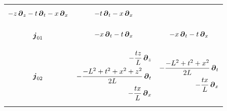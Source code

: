 \documentclass[a4paper,12pt]{article}
\begin{document}
\begin{table}[H]
\begin{adjustbox}{width=0.80\textwidth}
\begin{tabular}{ccc}
{\begin{equation*}
                        \begin{split}
                           -z \, \boldsymbol{\partial}_z -t \, \boldsymbol{\partial}_t -x \, \boldsymbol{\partial}_x
                        \end{split}
                     \end{equation*}} & \parbox{0.3\textwidth}{\begin{equation*}
                        \begin{split}
                           -t \, \boldsymbol{\partial}_t -x \, \boldsymbol{\partial}_x
                        \end{split}
                     \end{equation*}} \\
                     $\boldsymbol{j}_{0 1}$ & \parbox{0.3\textwidth}{\begin{equation*}
                        \begin{split}
                           -x \, \boldsymbol{\partial}_t -t \, \boldsymbol{\partial}_x
                        \end{split}
                     \end{equation*}} & \parbox{0.3\textwidth}{\begin{equation*}
                        \begin{split}
                           -x \, \boldsymbol{\partial}_t -t \, \boldsymbol{\partial}_x
                        \end{split}
                     \end{equation*}} \\
                     $\boldsymbol{j}_{0 2}$ & \parbox{0.3\textwidth}{\begin{equation*}
                        \begin{split}
                           -\frac{t z}{L} \, \boldsymbol{\partial}_z \\ - \frac{-L^2 + t^2 + x^2 + z^2}{2 L} \, \boldsymbol{\partial}_t \\ - \frac{t x}{L} \, \boldsymbol{\partial}_x
                        \end{split}
                     \end{equation*}} & \parbox{0.3\textwidth}{\begin{equation*}
                        \begin{split}
                           - \frac{-L^2 + t^2 + x^2}{2 L} \, \boldsymbol{\partial}_t \\ - \frac{t x}{L} \, \boldsymbol{\partial}_x
                        \end{split}
                     \end{equation*}} \\

\end{tabular}
\end{adjustbox}
\end{table}
\end{document}
